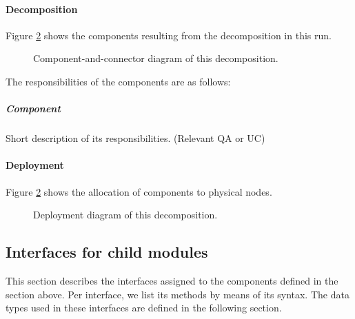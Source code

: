 {{{    \paragraph{Decomposition}
        Figure \ref{fig:FIGURELABEL} shows the components resulting from the
        decomposition in this run.

        \begin{figure}[!h]
        	\centering
        	\caption{Component-and-connector diagram of this decomposition.}
            \label{fig:FIGURELABEL}
        \end{figure}

        The responsibilities of the components are as follows:

    \subparagraph{Component}
        Short description of its responsibilities. (Relevant QA or UC)




    \paragraph{Deployment}
        Figure \ref{fig:FIGURELABEL} shows the allocation of components
        to physical nodes.

        \begin{figure}[!h]
        	\centering
        	\caption{Deployment diagram of this decomposition.}
            \label{fig:FIGURELABEL}
        \end{figure}


\subsection{Interfaces for child modules}\label{add2-interfaces}
    This section describes the interfaces assigned to the components defined
    in the section above. Per interface, we list its methods by means of its
    syntax. The data types used in these interfaces are defined in the following section. \\

}}}
